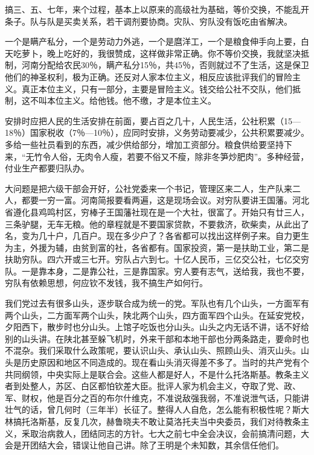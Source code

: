 搞三、五、七年，来个过程，基本上以原来的高级社为基础，等价交换，不能乱开条子。队与队是买卖关系，若干调剂要协商。灾队、穷队没有饭吃由省解决。

一个是瞒产私分，一个是劳动力外逃，一个是麿洋工，一个是粮食伸手向上要，白天吃萝卜，晚上吃好的，我很赞成，这样做非常正确。你不等价交换，我就坚决抵制，河南分配给农民30％，瞒产私分15％，共45％，否则就过不了生活，这是保卫他们的神圣权利，极为正确。还反对人家本位主义，相反应该批评我们的冒险主义。真正本位主义，只有一部分，主要是冒险主义。钱交给公社不交队，他们抵制，这不叫本位主义。给他钱。他不缴，才是本位主义。

安排时应把人民的生活安排在前面，要占百之几十，人民生活，公社积累（15—18％）国家税收（7％—10％），应同时安排，义务劳动要减少，公共积累要减少。多给一些社员看到的东西，减少供给部分，增加工资部分。粮食供给要坚持下来，“无竹令人俗，无肉令人瘦，若要不俗又不瘦，除非冬笋炒肥肉”。多种经营，付业生产都要归队办。

大问题是把六级干部会开好，公社党委来一个书记，管理区来二人，生产队来二人，都要一穷一富。河南简报要看两遍，这是现场会议。对穷队要讲王国藩。河北省遵化县鸡鸣村区，穷棒子王国藩社现在是一个大社，很富了。开始只有廿三人，三条驴腿，无车无粮。他的章程就是不要国家贷款，不要救济，砍柴卖，从此出了名，变为几十户，几百户。现在多少户了？各省都可以找出这样例子来。自力更生为主，外援为辅，由贫到富的社，各省都有。国家投资，第一是扶助工业，第二是扶助穷队。四六开或三七开。穷队占六到七。十亿人民币，三亿交公社，七亿交穷队。一是靠本身，二是靠公社，三是靠国家。穷人要有志气，送给我，我也不要，穷队有依赖思想，何应钦不发钱，我不搞生产如何行。

我们党过去有很多山头，逐步联合成为统一的党。军队也有几个山头，一方面军有两个山头，二方面军两个山头，陕北两个山头，四方面军四个山头。在延安党校，夕阳西下，散步时也分山头。上馆子吃饭也分山头。山头之内无话不讲，话不好给别的山头讲。在陕北甚至躲飞机时，外来干部和本地干部也分两条路走，要命时也不混杂。我们采取什么政策呢，要认识山头、承认山头、照顾山头、消灭山头。山头是历史原因和地区不同造成的。现在看山头消灭得差不多了。当时的共产党有个共同纲领，中央实际上是联合会。这些人都是好人，不是什么托洛斯基。教条主义者到处整人，苏区、白区都怕钦差大臣。批评人家为机会主义，夺取了党、政、军、财权，他是百分之百的布尔什维克，不准说敌强我弱，不准说泄气话，只能讲壮气的话，曾几何时（三年半）长征了。整得人人自危，怎么能有积极性呢？斯大林搞托洛斯基，反复几次，赫鲁晓夫不敢让莫洛托夫当中央委员，我们对待教条主义，釆取治病救人，团结同志的方针。七大之前七中全会决议，会前搞清问题，大会是开团结大会，错误让他自己讲。除了王明是个未知数，其余信任他们。

